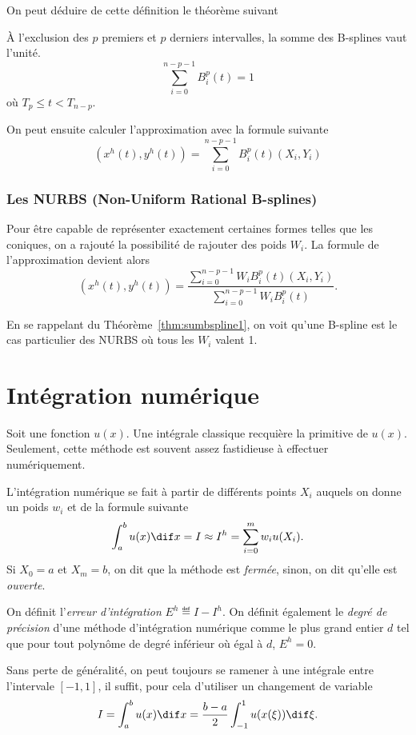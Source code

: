 On peut déduire de cette définition le théorème suivant
\begin{mytheo}
  \label{thm:sumbspline1}
  À l'exclusion des $p$ premiers et $p$ derniers intervalles,
  la somme des B-splines vaut l'unité.
  \[ \sum_{i=0}^{n-p-1} B_i^p(t) = 1 \]
  où $T_p \leq t < T_{n-p}$.
\end{mytheo}

On peut ensuite calculer l'approximation avec la formule suivante
\[ (x^h(t), y^h(t)) = \sum_{i=0}^{n-p-1} B_i^p(t) (X_i, Y_i) \]

\section{Les NURBS (Non-Uniform Rational B-splines)}
Pour être capable de représenter exactement certaines formes telles
que les coniques, on a rajouté la possibilité de rajouter des poids $W_i$.
La formule de l'approximation devient alors
\[ (x^h(t), y^h(t)) =
\frac{\sum_{i=0}^{n-p-1}W_iB_i^p(t)(X_i, Y_i)}
{\sum_{i=0}^{n-p-1}W_iB_i^p(t)}. \]

En se rappelant du Théorème~\ref{thm:sumbspline1}, on voit
qu'une B-spline est le cas particulier des NURBS où tous les $W_i$ valent 1.

\part{Intégration numérique}
Soit une fonction $u(x)$.
Une intégrale classique recquière la primitive de $u(x)$.
Seulement, cette méthode est souvent assez fastidieuse à effectuer
numériquement.

L'intégration numérique se fait à partir de différents points $X_i$ auquels
on donne un poids $w_i$ et de la formule suivante
\[ \int_a^b u(x) \dif x = I \approx I^h = \sum_{i=0}^m w_i u(X_i). \]
Si $X_0 = a$ et $X_m = b$, on dit que la méthode est \emph{fermée},
sinon, on dit qu'elle est \emph{ouverte}.

On définit l'\emph{erreur d'intégration} $E^h \eqdef I - I^h$.
On définit également le \emph{degré de précision} d'une méthode d'intégration
numérique comme le plus grand entier $d$ tel que pour tout polynôme de degré
inférieur où égal à $d$, $E^h = 0$.

Sans perte de généralité, on peut toujours se ramener à une intégrale
entre l'intervale $[-1, 1]$, il suffit, pour cela d'utiliser un changement
de variable
\[ I = \int_a^b u(x) \dif x =
\frac{b-a}{2} \int_{-1}^1 u(x(\xi)) \dif \xi. \]

